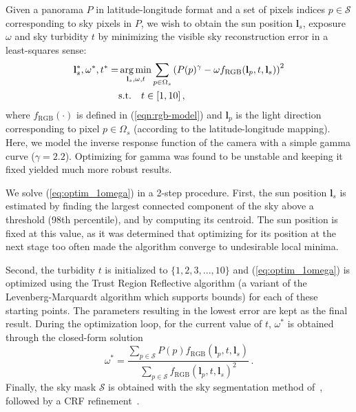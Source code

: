 Given a panorama $P$ in latitude-longitude format and a set of pixels indices $p \in \mathcal{S}$ corresponding to sky pixels in $P$, we wish to obtain the sun position $\mathbf{l}_s$, exposure $\omega$ and sky turbidity $t$ by minimizing the visible sky reconstruction error in a least-squares sense: 
%
\begin{equation}
\begin{split}
\mathbf{l}_s^*,\omega^*,t^* =& \operatorname*{arg\,min}_{\mathbf{l}_s,\omega,t} \sum_{p \in \Omega_s} \left(P(p)^\gamma - \omega f_\text{RGB}(\mathbf{l}_p, t, \mathbf{l}_s) \right)^2 \\
& \text{s.t.} \quad t \in [1, 10] \,, \label{eq:optim_1omega}
\end{split}
\end{equation}
%
where $f_\text{RGB}(\cdot)$ is defined in (\ref{eqn:rgb-model}) and $\mathbf{l}_p$ is the light direction corresponding to pixel $p \in \Omega_s$ (according to the latitude-longitude mapping). Here, we model the inverse response function of the camera with a simple gamma curve ($\gamma = 2.2$). Optimizing for gamma was found to be unstable and keeping it fixed yielded much more robust results. 

We solve (\ref{eq:optim_1omega}) in a 2-step procedure. First, the sun position $\mathbf{l}_s$ is estimated by finding the largest connected component of the sky above a threshold (98th percentile), and by computing its centroid. The sun position is fixed at this value, as it was determined that optimizing for its position at the next stage too often made the algorithm converge to undesirable local minima. 

Second, the turbidity $t$ is initialized to $\{1, 2, 3, ..., 10\}$ and (\ref{eq:optim_1omega}) is optimized using the Trust Region Reflective algorithm (a variant of the Levenberg-Marquardt algorithm which supports bounds) for each of these starting points. The parameters resulting in the lowest error are kept as the final result. During the optimization loop, for the current value of $t$, $\omega^*$ is obtained through the closed-form solution
\begin{equation}
\label{eq:omega_cfs}
\omega^* = \frac{\sum_{p \in \mathcal{S}} P(p) f_\text{RGB}(\mathbf{l}_p, t, \mathbf{l}_{s})}{\sum_{p \in \mathcal{S}} f_\text{RGB}(\mathbf{l}_p, t, \mathbf{l}_s)^2} \,.
\end{equation}
%
Finally, the sky mask $\mathcal{S}$ is obtained with the sky segmentation method of~\cite{tsai-siggraph-16}, followed by a CRF refinement~\cite{krahenbuhl-nips-12}.

